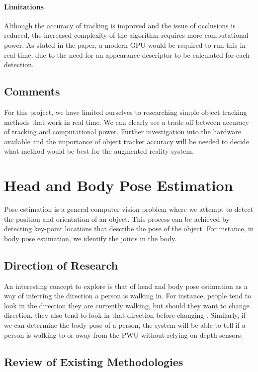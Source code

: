 \paragraph{Limitations}
Although the accuracy of tracking is improved and the issue of occlusions is reduced, the increased complexity of the algorithm requires more computational power. As stated in the paper, a modern GPU would be required to run this in real-time, due to the need for an appearance descriptor to be calculated for each detection.

\subsection{Comments} \label{sec:objectTrackComments}
For this project, we have limited ourselves to researching simple object tracking methods that work in real-time. We can clearly see a trade-off between accuracy of tracking and computational power. Further investigation into the hardware available and the importance of object tracker accuracy will be needed to decide what method would be best for the augmented reality system.

\section{Head and Body Pose Estimation}
Pose estimation is a general computer vision problem where we attempt to detect the position and orientation of an object. This process can be achieved by detecting key-point locations that describe the pose of the object. For instance, in body pose estimation, we identify the joints in the body.

\subsection{Direction of Research}
An interesting concept to explore is that of head and body pose estimation as a way of inferring the direction a person is walking in. For instance, people tend to look in the direction they are currently walking, but should they want to change direction, they also tend to look in that direction before changing \cite{Valenti2012}. Similarly, if we can determine the body pose of a person, the system will be able to tell if a person is walking to or away from the PWU without relying on depth sensors.

\subsection{Review of Existing Methodologies}

